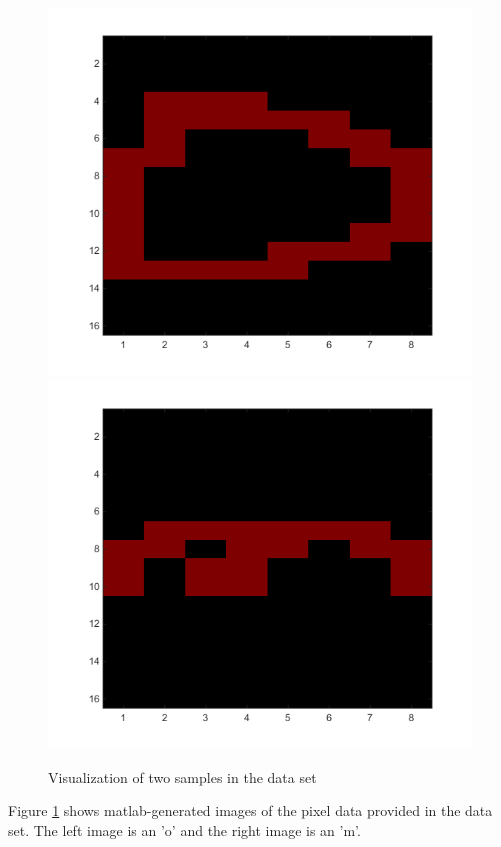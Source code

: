 \documentclass{article} %
\begin{document}
\begin{figure}[h]
\begin{center}
	\includegraphics[scale=0.15]{o.png}
	\includegraphics[scale=0.15]{m.png}
\end{center}
\caption{Visualization of two samples in the data set}
\label{fig:dataset-letters}
\end{figure}

Figure \ref{fig:dataset-letters} shows matlab-generated images of the pixel data provided in the data set. The left image is an 'o' and the right image is an 'm'.
\end{document}
